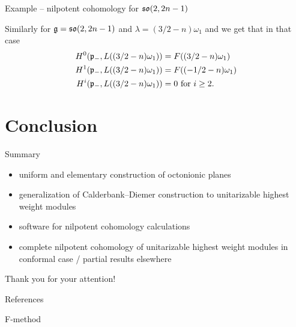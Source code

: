 \documentclass[10pt]{beamer}
\begin{document}
\begin{frame}{Example -- nilpotent cohomology for $ \mathfrak{so}(2,2n-1)$}


Similarly for $\mathfrak{g} = \mathfrak{so}(2,2n-1)$ and $\lambda = (3/2 - n)\omega_1$ and we get that in that case
\begin{align*}
 H^0(\mathfrak{p}_-,L((3/2-n)\omega_1)) &= F((3/2-n)\omega_1)\\
 H^1(\mathfrak{p}_-,L((3/2-n)\omega_1)) &= F((-1/2-n)\omega_1)\\
 H^i(\mathfrak{p}_-,L((3/2-n)\omega_1)) &= 0 \text{ for } i\geq 2.
\end{align*}

\end{frame}


\section{Conclusion}


\begin{frame}{Summary}

\begin{itemize}
 \item uniform and elementary construction of octonionic planes 
 \item generalization of Calderbank--Diemer construction to unitarizable highest weight modules
 \item software for nilpotent cohomology calculations 
 \item complete nilpotent cohomology of unitarizable highest weight modules in conformal case / partial results elsewhere
\end{itemize}

\end{frame}


{

\begin{frame}[standout]

Thank you for your attention!

\end{frame}

}


\appendix


\begin{frame}[allowframebreaks]{References}


% 

% 

\printbibliography


\end{frame}



\begin{frame}{F-method}


\end{frame}
\end{document}
